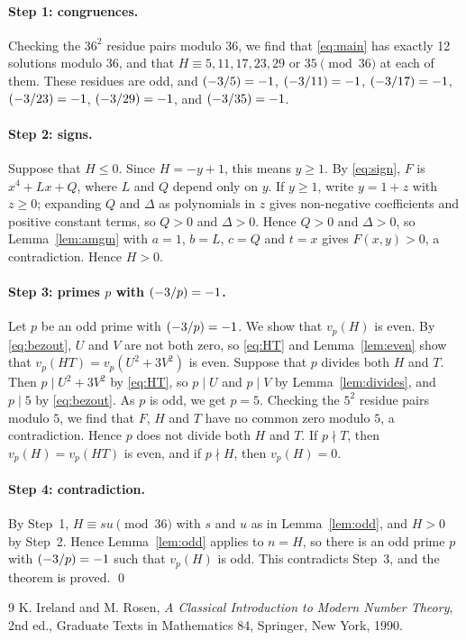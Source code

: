 \documentclass[11pt]{article}
\newcommand{\leg}[2]{\mathchoice{\biggl(\dfrac{#1}{#2}\biggr)}{(#1/#2)}{(#1/#2)}{(#1/#2)}}
\begin{document}
\paragraph{Step 1: congruences.} Checking the $36^2$ residue pairs modulo $36$, we find that \eqref{eq:main} has exactly 12 solutions modulo $36$, and that $H\equiv5,\allowbreak 11,\allowbreak 17,\allowbreak 23,\allowbreak 29\text{ or }35\pmod{36}$ at each of them. These residues are odd, and $\leg{-3}{5}=-1$, $\leg{-3}{11}=-1$, $\leg{-3}{17}=-1$, $\leg{-3}{23}=-1$, $\leg{-3}{29}=-1$, and $\leg{-3}{35}=-1$.

\paragraph{Step 2: signs.} Suppose that $H\leq0$. Since $H=-y+1$, this means $y\geq1$. By \eqref{eq:sign}, $F$ is $x^4+Lx+Q$, where $L$ and $Q$ depend only on $y$. If $y\geq1$, write $y=1+z$ with $z\geq0$; expanding $Q$ and $\Delta$ as polynomials in $z$ gives non-negative coefficients and positive constant terms, so $Q>0$ and $\Delta>0$. Hence $Q>0$ and $\Delta>0$, so Lemma~\ref{lem:amgm} with $a=1$, $b=L$, $c=Q$ and $t=x$ gives $F(x,y)>0$, a contradiction. Hence $H>0$.

\paragraph{\texorpdfstring{Step 3: primes $p$ with $\leg{-3}{p}=-1$.}{Step 3: inert primes.}} Let $p$ be an odd prime with $\leg{-3}{p}=-1$. We show that $v_p(H)$ is even. By \eqref{eq:bezout}, $U$ and $V$ are not both zero, so \eqref{eq:HT} and Lemma~\ref{lem:even} show that $v_p(HT)=v_p(U^2+3V^2)$ is even. Suppose that $p$ divides both $H$ and $T$. Then $p\mid U^2+3V^2$ by \eqref{eq:HT}, so $p\mid U$ and $p\mid V$ by Lemma~\ref{lem:divides}, and $p\mid 5$ by \eqref{eq:bezout}. As $p$ is odd, we get $p=5$. Checking the $5^2$ residue pairs modulo $5$, we find that $F$, $H$ and $T$ have no common zero modulo $5$, a contradiction. Hence $p$ does not divide both $H$ and $T$. If $p\nmid T$, then $v_p(H)=v_p(HT)$ is even, and if $p\nmid H$, then $v_p(H)=0$.

\paragraph{Step 4: contradiction.} By Step~1, $H\equiv su\pmod{36}$ with $s$ and $u$ as in Lemma~\ref{lem:odd}, and $H>0$ by Step~2. Hence Lemma~\ref{lem:odd} applies to $n=H$, so there is an odd prime $p$ with $\leg{-3}{p}=-1$ such that $v_p(H)$ is odd. This contradicts Step~3, and the theorem is proved.
\qed

\begin{thebibliography}{9}
 K. Ireland and M. Rosen, \emph{A Classical Introduction to Modern Number Theory}, 2nd ed., Graduate Texts in Mathematics 84, Springer, New York, 1990.
\end{thebibliography}
\end{document}

